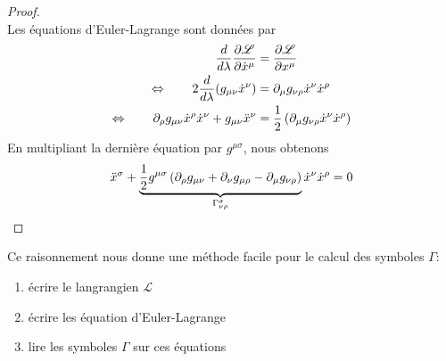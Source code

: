 \documentclass[a4paper,11pt]{report}
\begin{document}
            \begin{proof}${}$\\
                Les équations d'Euler-Lagrange sont données par
                \begin{align}
                    \frac{d}{d\lambda}\pdv{\mathscr{L}}{\dot{x}^\mu} &= \pdv{\mathscr{L}}{x^\mu}\\
                    \Leftrightarrow\qquad 2\frac{d}{d\lambda}(g_{\mu\nu}\dot{x}^\nu) &= \partial_\mu g_{\nu\rho}\dot{x}^\nu\dot{x}^\rho\\
                    \Leftrightarrow\qquad \partial_\rho g_{\mu\nu}\dot{x}^\rho\dot{x}^\nu + g_{\mu\nu}\ddot{x}^\nu &= \frac{1}{2}\left( \partial_\mu g_{\nu\rho}\dot{x}^\nu\dot{x}^\rho \right)
                \end{align}
                En multipliant la dernière équation par $g^{\mu\sigma}$, nous obtenons
                \begin{equation}
                    \ddot{x}^\sigma + \underbrace{\frac{1}{2} g^{\mu\sigma}\left( \partial_\rho g_{\mu\nu}+\partial_\nu g_{\mu\rho} - \partial_\mu g_{\nu\rho} \right)}_{\Gamma^\sigma_{\nu\rho}}\dot{x}^\nu\dot{x}^\rho = 0\label{eq:calculgamma}
                \end{equation}
            \end{proof}
            
            Ce raisonnement nous donne une méthode facile pour le calcul des symboles $\Gamma$:
            \begin{enumerate}
                \item écrire le langrangien $\mathscr{L}$
                \item écrire les équation d'Euler-Lagrange
                \item lire les symboles $\Gamma$ sur ces équations
            \end{enumerate}
            
\end{document}
